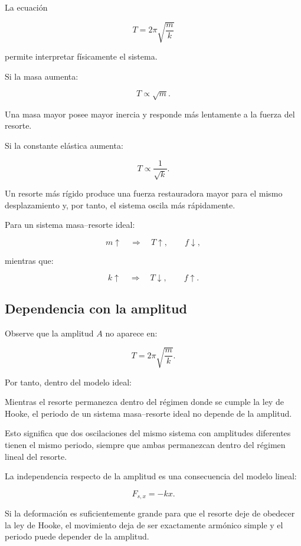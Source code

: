 La ecuación

\[ T=2\pi\sqrt{\frac{m}{k}} \]

permite interpretar físicamente el sistema.

Si la masa aumenta:

\[ T\propto\sqrt{m}. \]

Una masa mayor posee mayor inercia y responde más lentamente a la fuerza del resorte.

Si la constante elástica aumenta:

\[ T\propto\frac{1}{\sqrt{k}}. \]

Un resorte más rígido produce una fuerza restauradora mayor para el mismo desplazamiento y, por tanto, el sistema oscila más rápidamente.

\begin{interpretacion}
Para un sistema masa--resorte ideal:

\[
m\uparrow
\quad\Longrightarrow\quad
T\uparrow,\qquad f\downarrow,
\]

mientras que:

\[
k\uparrow
\quad\Longrightarrow\quad
T\downarrow,\qquad f\uparrow.
\]
\end{interpretacion}


\subsection{Dependencia con la amplitud}

Observe que la amplitud \(A\) no aparece en:

\[ T=2\pi\sqrt{\frac{m}{k}}. \]

Por tanto, dentro del modelo ideal:

\begin{principio}
Mientras el resorte permanezca dentro del régimen donde se cumple la ley de Hooke, el periodo de un sistema masa--resorte ideal no depende de la amplitud.
\end{principio}

Esto significa que dos oscilaciones del mismo sistema con amplitudes diferentes tienen el mismo periodo, siempre que ambas permanezcan dentro del régimen lineal del resorte.

\begin{advertencia}
La independencia respecto de la amplitud es una consecuencia del modelo lineal:

\[ F_{s,x}=-kx. \]

Si la deformación es suficientemente grande para que el resorte deje de obedecer la ley de Hooke, el movimiento deja de ser exactamente armónico simple y el periodo puede depender de la amplitud.
\end{advertencia}


